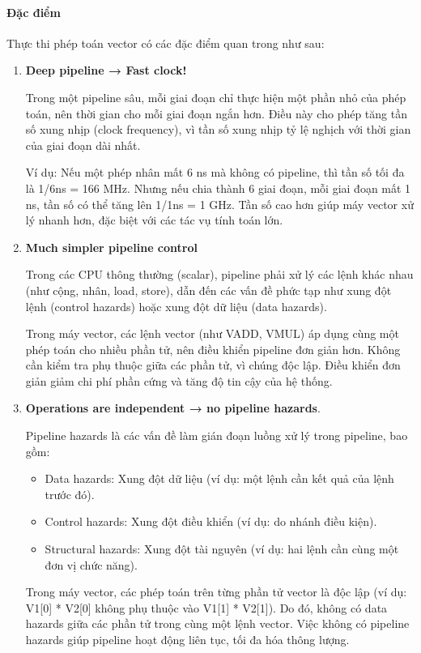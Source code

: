 \documentclass[a4paper]{article}
\begin{document}
\paragraph{Đặc điểm}
Thực thi phép toán vector có các đặc điểm quan trong như sau:
\begin{enumerate}
    \item \textbf{Deep pipeline → Fast clock!}\par Trong một pipeline sâu, mỗi giai đoạn chỉ thực hiện một phần nhỏ của phép toán, nên thời gian cho mỗi giai đoạn ngắn hơn. Điều này cho phép tăng tần số xung nhịp (clock frequency), vì tần số xung nhịp tỷ lệ nghịch với thời gian của giai đoạn dài nhất.\par
    Ví dụ: Nếu một phép nhân mất 6 ns mà không có pipeline, thì tần số tối đa là 1/6ns = 166 MHz. Nhưng nếu chia thành 6 giai đoạn, mỗi giai đoạn mất 1 ns, tần số có thể tăng lên 1/1ns = 1 GHz.	Tần số cao hơn giúp máy vector xử lý nhanh hơn, đặc biệt với các tác vụ tính toán lớn.

    \item \textbf{Much simpler pipeline control}	\par Trong các CPU thông thường (scalar), pipeline phải xử lý các lệnh khác nhau (như cộng, nhân, load, store), dẫn đến các vấn đề phức tạp như xung đột lệnh (control hazards) hoặc xung đột dữ liệu (data hazards). \par
    Trong máy vector, các lệnh vector (như VADD, VMUL) áp dụng cùng một phép toán cho nhiều phần tử, nên điều khiển pipeline đơn giản hơn. Không cần kiểm tra phụ thuộc giữa các phần tử, vì chúng độc lập.	Điều khiển đơn giản giảm chi phí phần cứng và tăng độ tin cậy của hệ thống.

    \item \textbf{Operations are independent → no pipeline hazards}. \par Pipeline hazards là các vấn đề làm gián đoạn luồng xử lý trong pipeline, bao gồm:
    \begin{itemize}
        \item Data hazards: Xung đột dữ liệu (ví dụ: một lệnh cần kết quả của lệnh trước đó).
        \item Control hazards: Xung đột điều khiển (ví dụ: do nhánh điều kiện).
        \item Structural hazards: Xung đột tài nguyên (ví dụ: hai lệnh cần cùng một đơn vị chức năng).
    \end{itemize}
    Trong máy vector, các phép toán trên từng phần tử vector là độc lập (ví dụ: V1[0] * V2[0] không phụ thuộc vào V1[1] * V2[1]). Do đó, không có data hazards giữa các phần tử trong cùng một lệnh vector.	Việc không có pipeline hazards giúp pipeline hoạt động liên tục, tối đa hóa thông lượng.


\end{enumerate}
\end{document}
